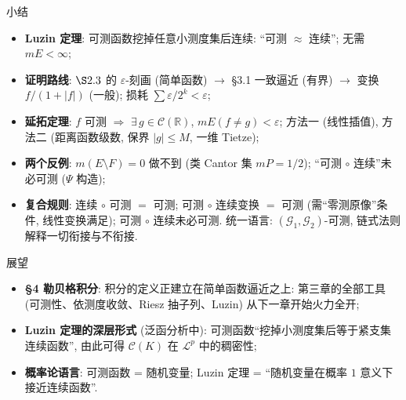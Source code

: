 \begin{frame}{小结}

\begin{itemize}
\item \textbf{Luzin 定理}: 可测函数挖掉任意小测度集后\alert{连续}:
  ``可测 $\approx$ 连续''; \alert{无需} $mE < \infty$;
\pause
\item \textbf{证明路线}: $\S 2.3$ 的 $\varepsilon$-刻画 (简单函数) $\to$ \S 3.1 一致逼近 (有界)
  $\to$ 变换 $f/(1+|f|)$ (一般); 损耗 $\sum \varepsilon/2^k < \varepsilon$;
\pause
\item \textbf{延拓定理}: $f$ 可测 $\Rightarrow$ $\exists\, g \in \mathcal{C}(\mathbb{R})$,
  $mE(f \neq g) < \varepsilon$; 方法一 (线性插值), 方法二 (距离函数级数, 保界 $|g| \leqslant M$, 一维 Tietze);
\pause
\item \textbf{两个反例}: $m(E \setminus F) = 0$ 做不到 (类 Cantor 集 $mP = 1/2$);
  ``可测 $\circ$ 连续''未必可测 ($\Psi$ 构造);
\pause
\item \textbf{复合规则}: 连续 $\circ$ 可测 $=$ 可测; 可测 $\circ$ 连续变换 $=$ 可测
  (需``零测原像''条件, 线性变换满足); 可测 $\circ$ 连续未必可测.
  统一语言: $(\mathcal{G}_1, \mathcal{G}_2)$-可测, 链式法则解释一切衔接与不衔接.
\end{itemize}

\end{frame}


\begin{frame}{展望}

\begin{itemize}
\item \textbf{\S 4 勒贝格积分}: 积分的定义正建立在\alert{简单函数逼近}之上:
  第三章的全部工具 (可测性、依测度收敛、Riesz 抽子列、Luzin) 从下一章开始火力全开;
\pause
\item \textbf{Luzin 定理的深层形式} (泛函分析中): 可测函数``挖掉小测度集后等于紧支集连续函数'',
  由此可得 $\mathcal{C}(K)$ 在 $\mathcal{L}^p$ 中的稠密性;
\pause
\item \textbf{概率论语言}: 可测函数 = 随机变量; Luzin 定理 = ``随机变量在概率 $1$ 意义下接近连续函数''.
\end{itemize}

\end{frame}





